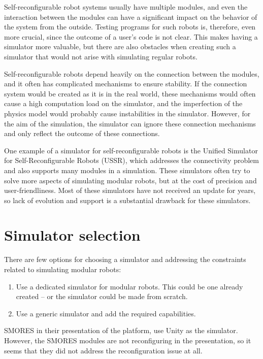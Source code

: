 \documentclass[
  printed, %
  color,   %
  notable, %
  oneside, %
  nolof,   %
  nolot,   %
  nocover,
]{fithesis3}
\begin{document}
Self-reconfigurable robot systems usually have multiple modules, and even the interaction between the modules can have a significant impact on the behavior of the system from the outside.
Testing programs for such robots is, therefore, even more crucial, since the outcome of a user's code is not clear.
This makes having a simulator more valuable, but there are also obstacles when creating such a simulator that would not arise with simulating regular robots.

Self-reconfigurable robots depend heavily on the connection between the modules, and it often has complicated mechanisms to ensure stability.
If the connection system would be created as it is in the real world, these mechanisms would often cause a high computation load on the simulator, and the imperfection of the physics model would probably cause instabilities in the simulator.
However, for the aim of the simulation, the simulator can ignore these connection mechanisms and only reflect the outcome of these connections.

One example of a simulator for self-reconfigurable robots is the Unified Simulator for Self-Reconfigurable Robots (USSR)\cite{ussr}, which addresses the connectivity problem and also supports many modules in a simulation.
These simulators often try to solve more aspects of simulating modular robots, but at the cost of precision and user-friendliness.
Most of these simulators have not received an update for years, so lack of evolution and support is a substantial drawback for these simulators.

\section{Simulator selection}

There are few options for choosing a simulator and addressing the constraints related to simulating modular robots:
\begin{enumerate}
    \item Use a dedicated simulator for modular robots.
    This could be one already created -- or the simulator could be made from scratch.
    \item Use a generic simulator and add the required capabilities.
\end{enumerate}

SMORES\cite{smores} in their presentation of the platform\cite{smores-video}, use Unity as the simulator.
However, the SMORES modules are not reconfiguring in the presentation, so it seems that they did not address the reconfiguration issue at all.
\end{document}
